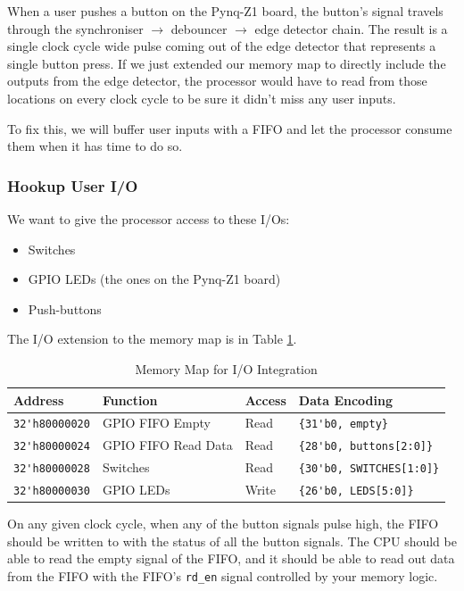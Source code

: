 \documentclass[11pt]{article}
\begin{document}
When a user pushes a button on the Pynq-Z1 board, the button's signal travels through the synchroniser $\rightarrow$ debouncer $\rightarrow$ edge detector chain.
The result is a single clock cycle wide pulse coming out of the edge detector that represents a single button press.
If we just extended our memory map to directly include the outputs from the edge detector, the processor would have to read from those locations on every clock cycle to be sure it didn't miss any user inputs.

To fix this, we will buffer user inputs with a FIFO and let the processor consume them when it has time to do so.


\subsubsection{Hookup User I/O}
We want to give the processor access to these I/Os:

\begin{itemize}
  \item Switches
  \item GPIO LEDs (the ones on the Pynq-Z1 board)
  \item Push-buttons
\end{itemize}

The I/O extension to the memory map is in Table \ref{mem_map2}.

\begin{table}[hbt]
  \begin{center}
    \caption{Memory Map for I/O Integration}
    \label{mem_map2}
    \begin{tabular}{l l l l}
      \toprule
      \textbf{Address} & \textbf{Function} & \textbf{Access} & \textbf{Data Encoding}\\
      \midrule
      \verb|32'h80000020| & GPIO FIFO Empty & Read & \verb|{31'b0, empty}| \\
      \verb|32'h80000024| & GPIO FIFO Read Data & Read & \verb|{28'b0, buttons[2:0]}| \\
      \midrule
      \verb|32'h80000028| & Switches & Read & \verb|{30'b0, SWITCHES[1:0]}| \\
      \midrule
      \verb|32'h80000030| & GPIO LEDs & Write & \verb|{26'b0, LEDS[5:0]}| \\
      \midrule
    \end{tabular}
  \end{center}
\end{table}

On any given clock cycle, when any of the button signals pulse high, the FIFO should be written to with the status of all the button signals.
The CPU should be able to read the empty signal of the FIFO, and it should be able to read out data from the FIFO with the FIFO's \verb|rd_en| signal controlled by your memory logic.
\end{document}
